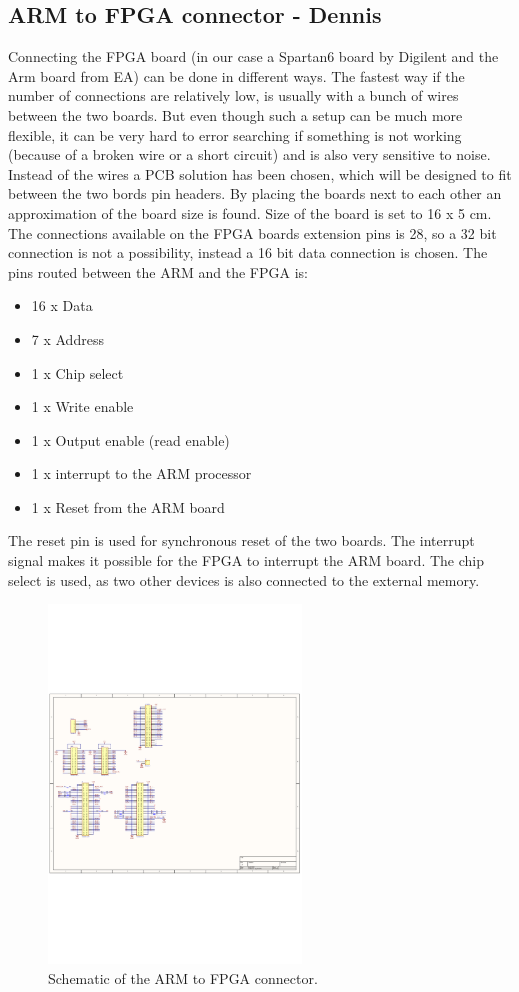 \subsection{ARM to FPGA connector - Dennis}
Connecting the FPGA board (in our case a Spartan6 board by Digilent and the Arm board from EA) can be done in different ways. The fastest way if the number of connections are relatively low, is usually with a bunch of wires between the two boards. But even though such a setup can be much more flexible, it can be very hard to error searching if something is not working (because of a broken wire or a short circuit) and is also very sensitive to noise. Instead of the wires a PCB solution has been chosen, which will be designed to fit between the two bords pin headers. By placing the boards next to each other an approximation of the board size is found. Size of the board is set to 16 x 5 cm. The connections available on the FPGA boards extension pins is 28, so a 32 bit connection is not a possibility, instead a 16 bit data connection is chosen. The pins routed between the ARM and the FPGA is:
\begin{itemize}
	\item 16 x Data
	\item 7 x Address
	\item 1 x Chip select
	\item 1 x Write enable 
	\item 1 x Output enable (read enable)
	\item 1 x interrupt to the ARM processor
	\item 1 x Reset from the ARM board
\end{itemize}
The reset pin is used for synchronous reset of the two boards. The interrupt signal makes it possible for the FPGA to interrupt the ARM board. The chip select is used, as two other devices is also connected to the external memory.
\begin{figure}[H]
	\begin{centering}
		 \includegraphics[width=0.60\textwidth,page=1]{images/dig_to_ea_v0_1}
		\caption{Schematic of the ARM to FPGA connector.}
	\end{centering}
\end{figure}
